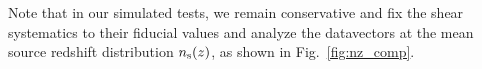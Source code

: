 \documentclass[aps, prd,twocolumn,superscriptaddress,nofootinbib,preprintnumbers]{revtex4-1}
\begin{document}
Note that in our simulated tests, we remain conservative and fix the shear systematics to their fiducial values and analyze the datavectors at the mean source redshift distribution $n_{\rm s}(z)$, as shown in Fig.~\ref{fig:nz_comp}. 




 



\end{document}
